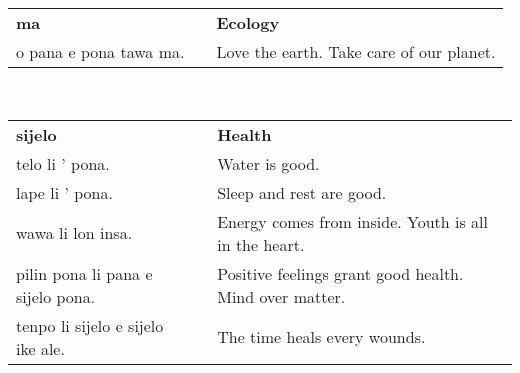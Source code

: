 %
\begin{supertabular}{p{6cm}|ll}
    \textbf{ma}            &  & \textbf{Ecology}                         \\
    o pana e pona tawa ma. &  & Love the earth. Take care of our planet. \\
\end{supertabular} \\
%
\begin{supertabular}{p{6cm}|ll}
    \textbf{sijelo}                   &  & \textbf{Health}                                        \\
    telo li ' pona.                   &  & Water is good.                                         \\
    lape li ' pona.                   &  & Sleep and rest are good.                               \\
    wawa li lon insa.                 &  & Energy comes from inside. Youth is all in the heart.   \\
    pilin pona li pana e sijelo pona. &  & Positive feelings grant good health. Mind over matter. \\
    tenpo li sijelo e sijelo ike ale. &  & The time heals every wounds.                           \\
\end{supertabular} \\
%
%
